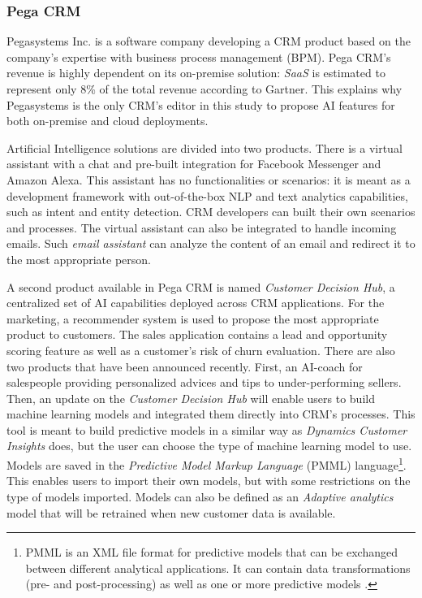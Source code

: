 \subsubsection*{Pega CRM}
Pegasystems Inc. is a software company developing a CRM product based on the company's expertise with business process management (BPM). Pega CRM's revenue is highly dependent on its on-premise solution: \textit{SaaS} is estimated to represent only 8\% of the total revenue according to Gartner. This explains why Pegasystems is the only CRM's editor in this study to propose AI features for both on-premise and cloud deployments.

Artificial Intelligence solutions are divided into two products. There is a virtual assistant with a chat and pre-built integration for Facebook Messenger and Amazon Alexa. This assistant has no functionalities or scenarios: it is meant as a development framework with out-of-the-box NLP and text analytics capabilities, such as intent and entity detection. CRM developers can built their own scenarios and processes. The virtual assistant can also be integrated to handle incoming emails. Such \textit{email assistant} can analyze the content of an email and redirect it to the most appropriate person.

A second product available in Pega CRM is named \textit{Customer Decision Hub}, a centralized set of AI capabilities deployed across CRM applications. For the marketing, a recommender system is used to propose the most appropriate product to customers. The sales application contains a lead and opportunity scoring feature as well as a customer's risk of churn evaluation. There are also two products that have been announced recently. First, an AI-coach for salespeople providing personalized advices and tips to under-performing sellers. Then, an update on the \textit{Customer Decision Hub} will enable users to build machine learning models and integrated them directly into CRM's processes. This tool is meant to build predictive models in a similar way as \textit{Dynamics Customer Insights} does, but the user can choose the type of machine learning model to use. Models are saved in the \textit{Predictive Model Markup Language} (PMML) language\footnote{PMML is an XML file format for predictive models that can be exchanged between different analytical applications. It can contain data transformations (pre- and post-processing) as well as one or more predictive models \cite{pmml}.}. This enables users to import their own models, but with some restrictions on the type of models imported. Models can also be defined as an \textit{Adaptive analytics} model that will be retrained when new customer data is available.

